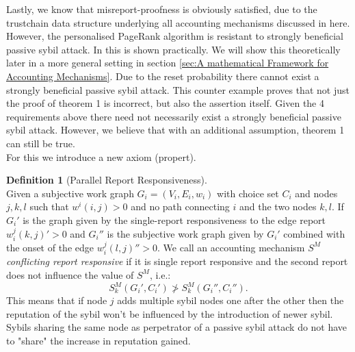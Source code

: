 \documentclass[11pt,a4paper]{report}
\theoremstyle{definition}
\newtheorem{definition}{Definition}[section]
\theoremstyle{theorem}
\theoremstyle{proposition}
\theoremstyle{corollary}
\theoremstyle{lemma}
\theoremstyle{example}
\theoremstyle{remark}
\begin{document}
\noindent{}Lastly, we know that misreport-proofness is obviously satisfied, due to the trustchain data structure underlying all accounting mechanisms discussed in here.\vspace{1em}\\

\noindent{}However, the personalised PageRank algorithm is resistant to strongly beneficial passive sybil attack. In \cite{A Random Walk Based Trust Ranking in Distributed Systems} this is shown practically. We will show this theoretically later in a more general setting in section \ref{sec:A mathematical Framework for Accounting Mechanisms}. Due to the reset probability there cannot exist a strongly beneficial passive sybil attack. This counter example proves that not just the proof of theorem 1 is incorrect, but also the assertion itself. Given the 4 requirements above there need not necessarily exist a strongly beneficial passive sybil attack. However, we believe that with an additional assumption, theorem 1 can still be true. \vspace{1em}\\

\noindent{}For this we introduce a new axiom (propert). \vspace{1em}\\

\begin{definition}[Parallel Report Responsiveness]\ \\
Given a subjective work graph $G_i=(V_i,E_i,w_i)$ with choice set $C_i$ and nodes $j,k,l$ such that $w^i(i,j)>0$ and no path connecting $i$ and the two nodes $k,l$. If $G_i'$ is the graph given by the single-report responsiveness to the edge report $w^j_i(k,j)'>0$ and $G_i''$ is the subjective work graph given by $G_i'$ combined with the onset of the edge $w^j_i(l,j)''>0$. We call an accounting mechanism $S^M$ {\it conflicting report responsive} if it is single report responsive and the second report does not influence the value of $S^M$, i.e.:
\[
S^M_k(G_i',C_i')\not>S^M_k(G_i'',C_i'').
\] 
This means that if node $j$ adds multiple sybil nodes one after the other then the reputation of the sybil won't be influenced by the introduction of newer sybil. Sybils sharing the same node as perpetrator of a passive sybil attack do not have to "share" the increase in reputation gained.
\end{definition}
\end{document}
